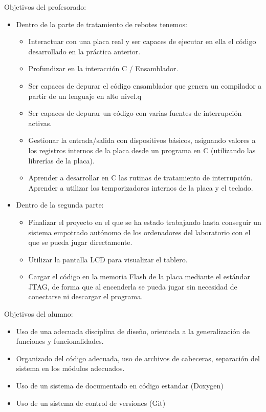 \documentclass[12pt,letterpaper]{article}
\begin{document}
Objetivos del profesorado:
\begin{itemize}
\item Dentro de la parte de tratamiento de rebotes tenemos:
  \begin{itemize}
  \item Interactuar con una placa real y ser capaces de ejecutar
    en ella el código desarrollado en la práctica anterior.
  \item Profundizar en la interacción C / Ensamblador.
  \item Ser capaces de depurar el código ensamblador que genera un
    compilador a partir de un lenguaje en alto nivel.q
  \item Ser capaces de depurar un código con varias fuentes de
    interrupción activas.
  \item Gestionar la entrada/salida con dispositivos básicos,
    asignando valores a los registros internos de la placa desde
    un programa en C (utilizando las librerías de la placa).
  \item Aprender a desarrollar en C las rutinas de tratamiento de
    interrupción. Aprender a utilizar los temporizadores internos
    de la placa y el teclado.
  \end{itemize}
\item Dentro de la segunda parte:
  \begin{itemize}
  \item Finalizar el proyecto en el que se ha estado trabajando
    hasta conseguir un sistema empotrado autónomo de los
    ordenadores del laboratorio con el que se pueda jugar
    directamente.
  \item Utilizar la pantalla LCD para visualizar el tablero.
  \item Cargar el código en la memoria Flash de la placa mediante
    el estándar JTAG, de forma que al encenderla se pueda jugar
    sin necesidad de conectarse ni descargar el programa.
  \end{itemize}
\end{itemize}

Objetivos del alumno:
\begin{itemize}
\item Uso de una adecuada disciplina de diseño, orientada a la
  generalización de funciones y funcionalidades.
\item Organizado del código adecuada, uso de archivos de cabeceras,
  separación del sistema en los módulos adecuados.
\item Uso de un sistema de documentado en código estandar (Doxygen)
\item Uso de un sistema de control de versiones (Git)
\end{itemize}
\end{document}
